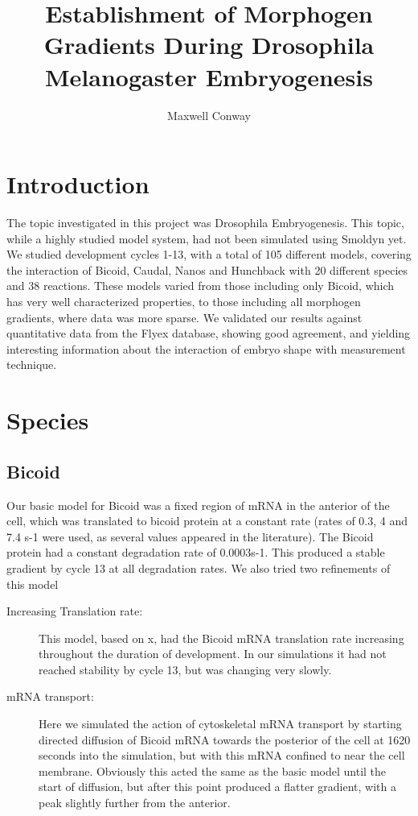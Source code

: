 \documentclass[11pt,a4paper,twocolumn]{article}
\begin{document}
\title{Establishment of Morphogen Gradients During Drosophila Melanogaster Embryogenesis}
\author{Maxwell Conway}
\date{}
\maketitle
\section{Introduction}
The topic investigated in this project was Drosophila Embryogenesis. This topic, while a highly studied model system, had not been simulated using Smoldyn yet. We studied development cycles 1-13, with a total of 105 different models, covering the interaction of Bicoid, Caudal, Nanos and Hunchback with 20 different species and 38 reactions. These models varied from those including only Bicoid, which has very well characterized properties, to those including all morphogen gradients, where data was more sparse. We validated our results against quantitative data from the Flyex database, showing good agreement, and yielding interesting information about the interaction of embryo shape with measurement technique. 

\section{Species}
\subsection{Bicoid}
Our basic model for Bicoid was a fixed region of mRNA in the anterior of the cell, which was translated to bicoid protein at a constant rate (rates of 0.3, 4 and 7.4 s-1 were used, as several values appeared in the literature). The Bicoid protein had a constant degradation rate of 0.0003s-1. This produced a stable gradient by cycle 13 at all degradation rates. We also tried two refinements of this model
\begin{description}
\item[Increasing Translation rate:]
This model, based on x, had the Bicoid mRNA translation rate increasing throughout the duration of development. In our simulations it had not reached stability by cycle 13, but was changing very slowly.
\item[mRNA transport:]
Here we simulated the action of cytoskeletal mRNA transport by starting directed diffusion of Bicoid mRNA towards the posterior of the cell at 1620 seconds into the simulation, but with this mRNA confined to near the cell membrane. Obviously this acted the same as the basic model until the start of diffusion, but after this point produced a flatter gradient, with a peak slightly further from the anterior.
\end{description}
\end{document}
